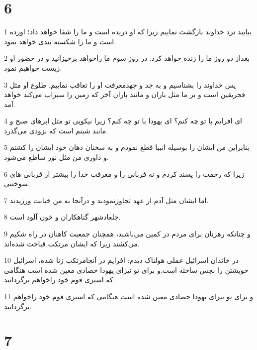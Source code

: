 \chapter{6}

\par 1 بیایید نزد خداوند بازگشت نماییم زیرا که او دریده است و ما را شفا خواهد داد؛ اوزده است و ما را شکسته بندی خواهد نمود.
\par 2 بعداز دو روز ما را زنده خواهد کرد. در روز سوم ما راخواهد برخیزانید و در حضور او زیست خواهیم نمود.
\par 3 پس خداوند را بشناسیم و به جد و جهدمعرفت او را تعاقب نماییم. طلوع او مثل فجریقین است و بر ما مثل باران و مانند باران آخر که زمین را سیراب می‌کند خواهد آمد.
\par 4 ‌ای افرایم با تو چه کنم؟ ای یهودا با تو چه کنم؟ زیرا نیکویی تو مثل ابرهای صبح و مانند شبنم است که بزودی می‌گذرد.
\par 5 بنابراین من ایشان را بوسیله انبیا قطع نمودم و به سخنان دهان خود ایشان را کشتم و داوری من مثل نور ساطع می‌شود.
\par 6 زیرا که رحمت را پسند کردم و نه قربانی را و معرفت خدا را بیشتر از قربانی های سوختنی.
\par 7 اما ایشان مثل آدم از عهد تجاوزنمودند و درآنجا به من خیانت ورزیدند.
\par 8 جلعادشهر گناهکاران و خون آلود است.
\par 9 و چنانکه رهزنان برای مردم در کمین می‌باشند، همچنان جمعیت کاهنان در راه شکیم می‌کشند زیرا که ایشان مرتکب قباحت شده‌اند.
\par 10 در خاندان اسرائیل عملی هولناک دیدم: افرایم در آنجامرتکب زنا شده، اسرائیل خویشتن را نجس ساخته است.و برای تو نیز‌ای یهودا حصادی معین شده است هنگامی که اسیری قوم خود راخواهم برگردانید.
\par 11 و برای تو نیز‌ای یهودا حصادی معین شده است هنگامی که اسیری قوم خود راخواهم برگردانید.

\chapter{7}

